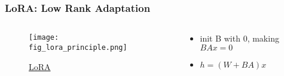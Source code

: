 \begin{frame}
    \frametitle{LoRA: Low Rank Adaptation}
    \begin{columns}[c]
        \begin{column}{0.3\textwidth} %
            \begin{figure}
                \texttt{[image: fig\_lora\_principle.png]}
                \caption{\href{http://arxiv.org/abs/2106.09685}{LoRA}}
            \end{figure}
        \end{column}
        \begin{column}{0.68\textwidth} %
            \begin{itemize}
                \item init B with 0, making $BAx = 0$
                \item $h = (W+BA)x$
            \end{itemize}
        \end{column}
    \end{columns}
\end{frame}